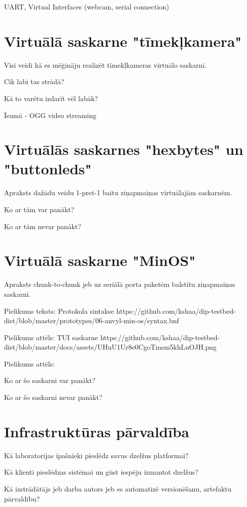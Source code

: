 UART, Virtual Interfaces (webcam, serial connection)

\section{Virtuālā saskarne "tīmekļkamera"}

Visi veidi kā es mēģināju realizēt tīmekļkameras virtuālo saskarni.

Cik labi tas strādā?

Kā to varētu izdarīt vēl labāk?

Īsumā - OGG video streaming

\section{Virtuālās saskarnes "hexbytes" un "buttonleds"}

Apraksts dažādu veidu 1-pret-1 baitu ziņapmaiņas virtuālajām saskarnēm.

Ko ar tām var panākt?

Ko ar tām nevar panākt?

\section{Virtuālā saskarne "MinOS"}

Apraksts chunk-to-chunk jeb uz seriālā porta paketēm balstītu ziņapmaiņas saskarni.

Pielikums teksts: Protokola sintakse https://github.com/kshaa/dip-testbed-dist/blob/master/prototypes/06-anvyl-min-os/syntax.bnf  

Pielikums attēls: TUI saskarne https://github.com/kshaa/dip-testbed-dist/blob/master/docs/assets/UHuU1Ur8e0CgoTmsm5khLuOJH.png

Pielikums attēls: 

Ko ar šo saskarni var panākt?

Ko ar šo saskarni nevar panākt?

\section{Infrastruktūras pārvaldība}

Kā laboratorijas īpašnieki pieslēdz savus dzelžus platformai?

Kā klienti pieslēdzas sistēmai un gūst iespēju izmantot dzelžus?

Kā izstrādātājs jeb darba autors jeb es automatizē versionēšanu, artefaktu pārvaldību?

